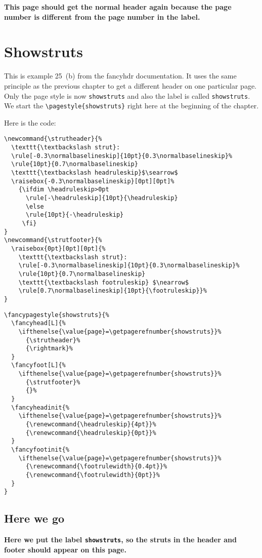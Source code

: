 \documentclass[openany]{book}
\newcommand{\strutheader}{%
  \texttt{\textbackslash strut}:
  \rule[-0.3\normalbaselineskip]{10pt}{0.3\normalbaselineskip}%
  \rule{10pt}{0.7\normalbaselineskip}
  \texttt{\textbackslash headruleskip}$\searrow$
  \raisebox{-0.3\normalbaselineskip}[0pt][0pt]%
    {\ifdim \headruleskip>0pt
      \rule[-\headruleskip]{10pt}{\headruleskip}
      \else
      \rule{10pt}{-\headruleskip}
     \fi}
}
\newcommand{\strutfooter}{%
  \raisebox{0pt}[0pt][0pt]{%
    \texttt{\textbackslash strut}:
    \rule[-0.3\normalbaselineskip]{10pt}{0.3\normalbaselineskip}%
    \rule{10pt}{0.7\normalbaselineskip}
    \texttt{\textbackslash footruleskip} $\nearrow$
    \rule[0.7\normalbaselineskip]{10pt}{\footruleskip}}%
}
\begin{document}
\lipsum[8-10]

\medskip

\noindent
\begin{boxedminipage}{\textwidth}
\textbf{This page should get the normal header again because the page number is different from the page number in the label.}
\end{boxedminipage}

\chapter{Showstruts}
\label{ch:showstruts}
\pagestyle{showstruts}

\begin{boxedminipage}{\textwidth}
This is example 25~(b) from the \textsf{fancyhdr} documentation. It uses the same principle as the previous chapter to get a different header on one particular page.
Only the page style is now \texttt{showstruts} and also the label is called \texttt{showstruts}.
We start the \verb|\pagestyle{showstruts}| right here at the beginning of the chapter.

Here is the code:

\begin{verbatim}
\newcommand{\strutheader}{%
  \texttt{\textbackslash strut}:
  \rule[-0.3\normalbaselineskip]{10pt}{0.3\normalbaselineskip}%
  \rule{10pt}{0.7\normalbaselineskip}
  \texttt{\textbackslash headruleskip}$\searrow$
  \raisebox{-0.3\normalbaselineskip}[0pt][0pt]%
    {\ifdim \headruleskip>0pt
      \rule[-\headruleskip]{10pt}{\headruleskip}
      \else
      \rule{10pt}{-\headruleskip}
     \fi}
}
\newcommand{\strutfooter}{%
  \raisebox{0pt}[0pt][0pt]{%
    \texttt{\textbackslash strut}:
    \rule[-0.3\normalbaselineskip]{10pt}{0.3\normalbaselineskip}%
    \rule{10pt}{0.7\normalbaselineskip}
    \texttt{\textbackslash footruleskip} $\nearrow$
    \rule[0.7\normalbaselineskip]{10pt}{\footruleskip}}%
}
\end{verbatim}
\end{boxedminipage}

\noindent
\begin{boxedminipage}{\textwidth}
\begin{verbatim}
\fancypagestyle{showstruts}{%
  \fancyhead[L]{%
    \ifthenelse{\value{page}=\getpagerefnumber{showstruts}}%
      {\strutheader}%
      {\rightmark}%
  }
  \fancyfoot[L]{%
    \ifthenelse{\value{page}=\getpagerefnumber{showstruts}}%
      {\strutfooter}%
      {}%
  }
  \fancyheadinit{%
    \ifthenelse{\value{page}=\getpagerefnumber{showstruts}}%
      {\renewcommand{\headruleskip}{4pt}}%
      {\renewcommand{\headruleskip}{0pt}}%
  }
  \fancyfootinit{%
    \ifthenelse{\value{page}=\getpagerefnumber{showstruts}}%
      {\renewcommand{\footrulewidth}{0.4pt}}%
      {\renewcommand{\footrulewidth}{0pt}}%
  }
}
\end{verbatim}
\end{boxedminipage}

\section{Here we go}

\lipsum[1-3]

\medskip
\noindent
\begin{boxedminipage}{\textwidth}
\textbf{Here we put the label \texttt{showstruts}, so the struts in the header and footer should appear on this page.}
\label{showstruts}
\end{boxedminipage}
\medskip

\lipsum[3-5]
\end{document}
